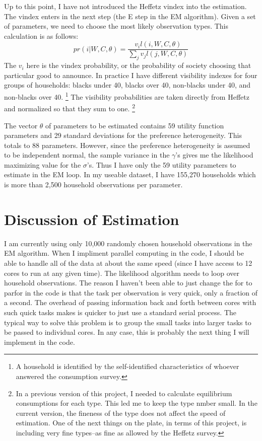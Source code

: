 \documentclass{article}
\begin{document}
Up to this point, I have not introduced the Heffetz vindex into the estimation. The vindex enters in the next step (the E step in the EM algorithm).
Given a set of parameters, we need to choose the most likely observation types.
This calculation is as follows:
\begin{equation}
	pr(i|W,C,\theta) = \frac{v_i l(i,W,C,\theta)}{\sum_j v_j l(j,W,C,\theta)}
\end{equation}
  The $v_i$ here is the vindex probability, or the probability of society choosing that particular good to announce.
In practice I have different visibility indexes for four groups of households: blacks under 40, blacks over 40, non-blacks under 40, and non-blacks over 40.
\footnote{A household is identified by the self-identified characteristics of whoever answered the consumption survey.} 
The visibility probabilities are taken directly from Heffetz and normalized so that they sum to one.
\footnote{In a previous version of this project, I needed to calculate equilibrium consumptions for each type.  This led me to keep the type nmber small.  In the current version, the fineness of the type does not affect the speed of estimation.  One of the next things on the plate, in terms of this project, is including very fine types--as fine as allowed by the Heffetz survey.}

The vector $\theta$ of parameters to be estimated contains 59 utility function parameters and 29 standard deviations for the preference heterogeneity.  
This totals to 88 parameters.  
However, since the preference heterogeneity is assumed to be independent normal, the sample variance in the $\gamma$'s gives me the likelihood maximizing value for the $\sigma$'s.
Thus I have only the 59 utility parameters to estimate in the EM loop. 
In my useable dataset, I have 155,270 households which is more than 2,500 household observations per parameter.
\section{Discussion of Estimation}
I am currently using only 10,000 randomly chosen household observations in the EM algorithm.
When I impliment parallel computing in the code, I should be able to handle all of the data at about the same speed (since I have access to 12 cores to run at any given time).
The likelihood algorithm needs to loop over household observations.
The reason I haven't been able to just change the for to parfor in the code is that the task per observation is very quick, only a fraction of a second.
The overhead of passing information back and forth between cores with such quick tasks makes is quicker to just use a standard serial process.
The typical way to solve this problem is to group the small tasks into larger tasks to be passed to individual cores.  
In any case, this is probably the next thing I will implement in the code.
\end{document}
